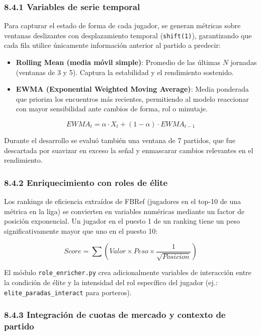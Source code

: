 \subsubsection{8.4.1 Variables de serie temporal}
 
Para capturar el estado de forma de cada jugador, se generan métricas sobre ventanas
deslizantes con desplazamiento temporal (\texttt{shift(1)}), garantizando que cada fila
utilice únicamente información anterior al partido a predecir:
 
\begin{itemize}
    \item \textbf{Rolling Mean (media móvil simple)}: Promedio de las últimas $N$
    jornadas (ventanas de 3 y 5). Captura la estabilidad y el rendimiento sostenido.
    \item \textbf{EWMA (Exponential Weighted Moving Average)}: Media ponderada que
    prioriza los encuentros más recientes, permitiendo al modelo reaccionar con mayor
    sensibilidad ante cambios de forma, rol o minutaje.
\end{itemize}
 
$$EWMA_t = \alpha \cdot X_t + (1-\alpha) \cdot EWMA_{t-1}$$
 
Durante el desarrollo se evaluó también una ventana de 7 partidos, que fue descartada
por suavizar en exceso la señal y enmascarar cambios relevantes en el rendimiento.
 
\subsubsection{8.4.2 Enriquecimiento con roles de élite}
 
Los rankings de eficiencia extraídos de FBRef (jugadores en el top-10 de una métrica en
la liga) se convierten en variables numéricas mediante un factor de posición exponencial.
Un jugador en el puesto 1 de un ranking tiene un peso significativamente mayor que uno
en el puesto 10:
 
$$Score = \sum \left(Valor \times Peso \times \frac{1}{\sqrt{Posicion}}\right)$$
 
El módulo \texttt{role\_enricher.py} crea adicionalmente variables de interacción entre
la condición de élite y la intensidad del rol específico del jugador (ej.:
\texttt{elite\_paradas\_interact} para porteros).
 
\subsubsection{8.4.3 Integración de cuotas de mercado y contexto de partido}
 
